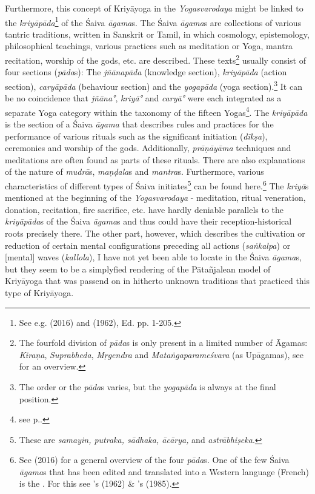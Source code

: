 Furthermore, this concept of Kriyāyoga in the \textit{Yogasvarodaya} might be linked to the \textit{kriyāpāda}\footnote{See e.g. \citeauthor{ganesan2016saiva} (2016) and  (1962), Ed. pp. 1-205.} of the Śaiva \textit{āgama}s. The Śaiva \textit{āgama}s are collections of various tantric traditions, written in Sanskrit or Tamil, in which cosmology, epistemology, philosophical teachings, various practices such as meditation or Yoga, mantra recitation, worship of the gods, etc. are described. These texts\footnote{The fourfold division of \textit{pāda}s is only present in a limited number of Āgamas: \textit{Kiraṇa}, \textit{Suprabheda}, \textit{Mṛgendra} and \textit{Mataṅgaparameśvara} (as Upāgamas), see \citeauthor[1993: 225-461]{brunner1994place} for an overview.} usually consist of four sections (\textit{pāda}s): The \textit{jñānapāda} (knowledge section), \textit{kriyāpāda} (action section), \textit{caryāpāda} (behaviour section) and the \textit{yogapāda} (yoga section).\footnote{The order or the \textit{pāda}s varies, but the \textit{yogapāda} is always at the final position.} It can be no coincidence that \textit{jñāna°}, \textit{kriyā°} and \textit{caryā°} were each integrated as a separate Yoga category within the taxonomy of the fifteen Yogas\footnote{see p.\pageref{intro}.}. The \textit{kriyāpāda} is the section of a Śaiva \textit{āgama} that describes rules and practices for the performance of various rituals such as the significant initiation (\textit{dīkṣa}), ceremonies and worship of the gods. Additionally, \textit{prāṇāyāma} techniques and meditations are often found as parts of these rituals. There are also explanations of the nature of \textit{mudrā}s, \textit{maṇḍala}s and \textit{mantra}s. Furthermore, various characteristics of different types of Śaiva initiates\footnote{These are \textit{samayin, putraka, sādhaka, ācārya,} and \textit{astrābhiṣeka}.} can be found here.\footnote{See \citeauthor{ganesan2016saiva} (2016) for a general overview of the four \textit{pāda}s. One of the few Śaiva \textit{āgama}s that has been edited and translated into a Western language (French) is the . For this see \citeauthor{mrgendragama}'s  (1962) \& \citeauthor{mrgendragamabrunner}'s  (1985).} The \textit{kriyā}s mentioned at the beginning of the \textit{Yogasvarodaya} - meditation, ritual veneration, donation, recitation, fire sacrifice, etc. have hardly deniable parallels to the \textit{kriyāpāda}s of the Śaiva \textit{āgama}s and thus could have their reception-historical roots precisely there. The other part, however, which describes the cultivation or reduction of certain mental configurations preceding all actions (\textit{saṅkalpa}) or [mental] waves (\textit{kallola}), I have not yet been able to locate in the Śaiva \textit{āgama}s, but they seem to be a simplyfied rendering of the Pātañjalean model of Kriyāyoga that was passend on in hitherto unknown traditions that practiced this type of Kriyāyoga.

